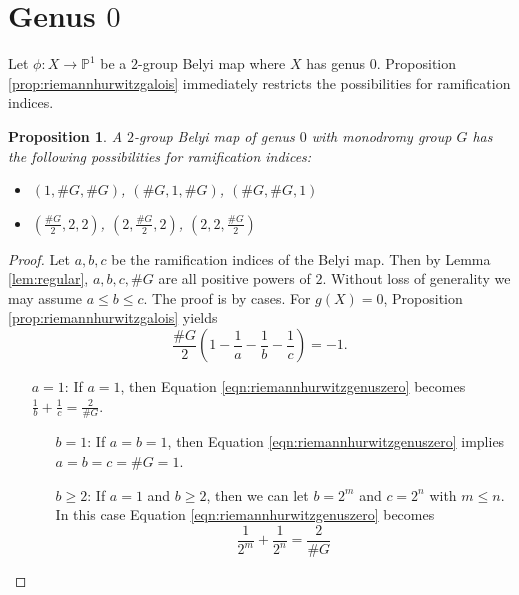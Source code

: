 \documentclass{dcthesis}
\newcommand{\PP}{\mathbb P}
\newtheorem{prop}{Proposition}[section]
\theoremstyle{definition}
\theoremstyle{remark}
\numberwithin{equation}{section}
\numberwithin{figure}{section}
\begin{document}
{  \section{Genus $0$}{\label{sec:genuszero}
    Let $\phi:X\to\PP^1$ be a $2$-group Belyi map where $X$ has genus $0$.
    Proposition \ref{prop:riemannhurwitzgalois} immediately restricts the
    possibilities for ramification indices.
    \begin{prop}\label{prop:genuszeroramification}
      A $2$-group Belyi map of genus $0$ with monodromy group $G$
      has the following possibilities for ramification indices:
      \begin{itemize}
        \item $(1,\#G, \#G)$, $(\#G, 1, \#G)$, $(\#G, \#G, 1)$
        \item
          $\left(\frac{\#G}{2}, 2, 2\right)$,
          $\left(2, \frac{\#G}{2}, 2\right)$,
          $\left(2, 2, \frac{\#G}{2}\right)$
      \end{itemize}
    \end{prop}
    \begin{proof}
      Let $a,b,c$ be the ramification indices of the Belyi map.
      Then by Lemma \ref{lem:regular},
      $a,b,c,\#G$ are all positive powers of $2$.
      Without loss of generality we may assume $a\le b\le c$.
      The proof is by cases.
      For $g(X)=0$, Proposition \ref{prop:riemannhurwitzgalois}
      yields
      \begin{equation}\label{eqn:riemannhurwitzgenuszero}
        \frac{\#G}{2}\left(1-\frac{1}{a}-\frac{1}{b}-\frac{1}{c}\right) = -1.
      \end{equation}
      \begin{itemize}
        \item[\underline{$a=1$}:]
          If $a=1$, then
          Equation \ref{eqn:riemannhurwitzgenuszero} becomes
          $\frac{1}{b}+\frac{1}{c}=\frac{2}{\#G}$.
          \begin{itemize}
            \item[\underline{$b=1$}:]
              If $a=b=1$, then
              Equation \ref{eqn:riemannhurwitzgenuszero}
              implies $a=b=c=\#G=1$.
            \item[\underline{$b\ge 2$}:]
              If $a=1$ and $b\geq 2$,
              then we can let $b=2^m$ and $c=2^n$ with $m\le n$.
              In this case
              Equation \ref{eqn:riemannhurwitzgenuszero} becomes
              \[
                \frac{1}{2^m}+\frac{1}{2^n} = \frac{2}{\#G}
\]
\end{itemize}
\end{itemize}
\end{proof}}}
\end{document}
